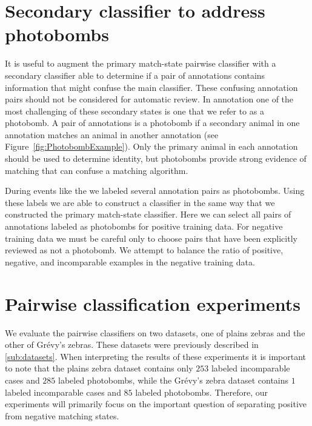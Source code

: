 \section{Secondary classifier to address photobombs}\label{sec:learnpb}
    It is useful to augment the primary match-state pairwise classifier with a secondary classifier able to
      determine if a pair of annotations contains information that might confuse the main classifier.
    These confusing annotation pairs should not be considered for automatic review.
    In annotation one of the most challenging of these secondary states is one that we refer to as a {photobomb}.
    A pair of annotations is a photobomb if a secondary animal in one annotation matches an animal in another
      annotation (\eg see Figure~\ref{fig:PhotobombExample}).
    Only the primary animal in each annotation should be used to determine identity, but photobombs provide
      strong evidence of matching that can confuse a matching algorithm.

    \PhotobombExample{}

    During events like the \GZC{} we labeled several annotation pairs as photobombs.
    Using these labels we are able to construct a classifier in the same way that we constructed the primary
      match-state classifier.
    Here we can select all pairs of annotations labeled as photobombs for positive training data.
    For negative training data we must be careful only to choose pairs that have been explicitly reviewed as not
      a photobomb.
    We attempt to balance the ratio of positive, negative, and incomparable examples in the negative training
      data.

\section{Pairwise classification experiments}\label{sec:pairexpt}

    We evaluate the pairwise classifiers on two datasets, one of plains zebras and the other of Grévy's zebras.
    These datasets were previously described in \cref{sub:datasets}.
    When interpreting the results of these experiments it is important to note that the plains zebra dataset
      contains only $253$ labeled incomparable cases and $285$ labeled photobombs, while the Grévy's zebra dataset
      contains $1$ labeled incomparable cases and $85$ labeled photobombs.
    Therefore, our experiments will primarily focus on the important question of separating positive from
      negative matching states.

